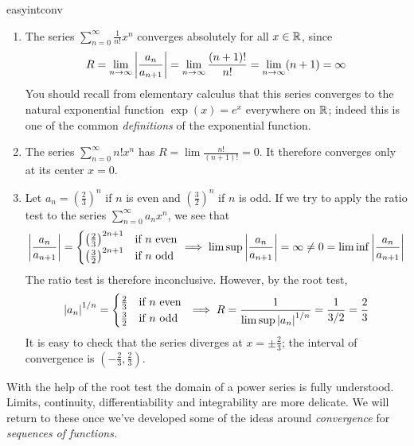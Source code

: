 \begin{examples}{}{easyintconv}
\begin{enumerate}
		\item The series $\sum_{n=0}^\infty \frac 1{n!}x^n$ converges absolutely for all $x\in\mathbb{R}$, since
	  \[
	  	R=\lim_{n\to\infty}\left| \frac{a_n}{a_{n+1}}\right|
	  	=\lim_{n\to\infty}\frac{(n+1)!}{n!}
	  	=\lim_{n\to\infty}(n+1)=\infty
	  \]
	  You should recall from elementary calculus that this series converges to the natural exponential function $\exp(x)=e^x$ everywhere on $\mathbb{R}$; indeed this is one of the common \emph{definitions} of the exponential function.
	
	
		\item The series $\sum_{n=0}^\infty n!x^n$ has $R=\lim\frac{n!}{(n+1)!}=0$. It therefore converges only at its center $x=0$.
	
	
		\item\label{ex:easyintconv2} Let $a_n=\left(\frac 23\right)^n$ if $n$ is even and $\left(\frac 32\right)^n$ if $n$ is odd. If we try to apply the ratio test to the series $\sum_{n=0}^\infty a_nx^n$, we see that
		\[
			\left| \frac{a_n}{a_{n+1}}\right|=
			\begin{cases}
				\left(\frac 23\right)^{2n+1}&\text{if $n$ even}\\
				\left(\frac 32\right)^{2n+1}&\text{if $n$ odd}
			\end{cases}
			\implies \limsup\left| \frac{a_n}{a_{n+1}}\right|
			=\infty\neq 0=\liminf\left| \frac{a_n}{a_{n+1}}\right|
		\]
		The ratio test is therefore inconclusive. However, by the root test,
		\[
			\nm{a_n}^{1/n}=
			\begin{cases}
				\frac 23&\text{if $n$ even}\\
				\frac 32&\text{if $n$ odd}
			\end{cases}\ 
			\implies R=\frac 1{\limsup\nm{a_n}^{1/n}}=\frac 1{3/2}=\frac 23
		\]
		It is easy to check that the series diverges at $x=\pm\frac 23$; the interval of convergence is $(-\frac 23,\frac 23)$.
	\end{enumerate}
\end{examples}
\goodbreak

With the help of the root test the domain of a power series is fully understood. Limits, continuity, differentiability and integrability are more delicate. We will return to these once we've developed some of the ideas around \emph{convergence} for \emph{sequences of functions.}

\goodbreak

